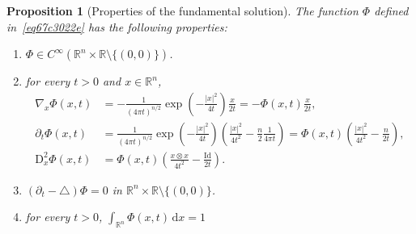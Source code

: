 \documentclass[a4paper,9pt]{amsart}
\newcommand{\R}{\mathbb{R}}	%
\newcommand{\Id}{\mathrm{Id}}	%
\newcommand{\did}{\,\mathrm{d}}	%
\newcommand{\de}{\partial}		%
\newcommand{\Diff}{\mathrm{D}}
\newcommand{\laplacian}{\triangle}
\newcommand{\grad}{\nabla}
\theoremstyle{plain}
\newtheorem{proposition}{Proposition}[section]
\theoremstyle{definition}
\theoremstyle{remark}
\begin{document}
\begin{proposition}[Properties of the fundamental solution]\label{prop67c302e8}
	The function $\Phi$ defined in~\eqref{eq67c3022e} has the following properties:
	\begin{enumerate}
	\item\label{prop67c302e8_smooth}
	$\Phi\in C^\infty(\R^n\times\R\setminus\{(0,0)\})$.
	\item\label{prop67c302e8_diff}
	for every $t>0$ and $x\in\R^n$, 
	\begin{align*}
		\grad_x\Phi(x,t) 
		&= - \frac1{(4\pi t)^{n/2}} \exp\left( -\frac{|x|^2}{4t} \right) \frac{x}{2t}
		= - \Phi(x,t) \frac{x}{2t} , \\
		\de_t \Phi(x,t) 
		&= \frac1{(4\pi t)^{n/2}} \exp\left( -\frac{|x|^2}{4t} \right) 
			\left( \frac{|x|^2}{4t^2} - \frac{n}{2} \frac1{4\pi t} \right) 
		= \Phi(x,t) \left( \frac{|x|^2}{4t^2} - \frac{n}{2t} \right) , \\
		\Diff^2_x\Phi(x,t)
		&= \Phi(x,t) \left( \frac{x\otimes x}{4t^2} - \frac{\Id}{2t} \right) .
	\end{align*} 
	\item\label{prop67c302e8_heat}
	$(\de_t-\laplacian)\Phi = 0$ in $\R^n\times\R\setminus\{(0,0)\}$.
	\item\label{prop67c302e8_intr}
	for every $t>0$, $\int_{\R^n} \Phi(x,t) \did x = 1$
	\end{enumerate}
\end{proposition}
\end{document}
